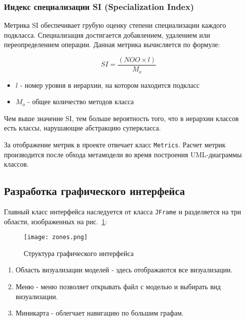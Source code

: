 \subsubsection{Индекс специализации SI (Specialization Index)}

Метрика SI обеспечивает грубую оценку степени специализации каждого подкласса.
Специализация достигается добавлением, удалением или переопределением операции.
Данная метрика вычисляется по формуле:

\begin{equation}
    SI = \frac{(NOO \times l)}{M_{o}}
\end{equation}

\begin{itemize}
    \item $l$ - номер уровня в иерархии, на котором находится подкласс
    \item $M_{o}$ - общее количество методов класса
\end{itemize}

Чем выше значение SI, тем больше вероятность того, что в иерархии классов есть
классы, нарушающие абстракцию суперкласса.

За отображение метрик в проекте отвечает класс \texttt{Metrics}. Расчет метрик
производится после обхода метамодели во время построения UML-диаграммы классов.

\subsection{Разработка графического интерфейса}

Главный класс интерфейса наследуется от класса \texttt{JFrame} и разделяется на
три области, изображенных на рис.~\ref{fig:zones}:

\begin{figure}[htb]
    \begin{center}
        \texttt{[image: zones.png]}
    \end{center}
    \caption{Структура графического интерфейса}
    \label{fig:zones}
\end{figure}

\begin{enumerate}
    \item Область визуализации моделей - здесь отображаются все визуализации.
    \item Меню - меню позволяет открывать файл с моделью и выбирать вид
    визуализации.
    \item Миникарта - облегчает навигацию по большим графам.
\end{enumerate}

